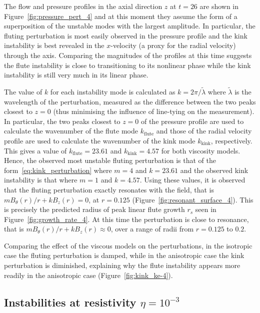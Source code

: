 \documentclass[fleqn,usenatbib]{mnras}
\newcommand{\rev}[1]{{\color{red} {#1}}}
\newcommand{\newold}[2]{{#1}{}}
\begin{document}
The \rev{flow and pressure profiles in the axial direction $z$} at
$t=26$ are shown in Figure~\ref{fig:pressure_pert_4} \rev{and at this
moment they assume the form of a superposition of the unstable modes
with the largest amplitude. In particular, the} fluting perturbation
  is most easily observed in the pressure \rev{profile and} \rev{\newold{}{ plotted
  as a function of $z$ following a line through the point $(r, \theta) = (0.101, 0)$.}} \rev{the} kink
instability is best revealed in the $x$-velocity (a proxy for the radial
velocity) through the axis. Comparing the magnitudes of the \rev{profiles} at
this time suggests the flute instability is close to transitioning to its
nonlinear phase while the kink instability is still very much in its linear
phase.

The value of $k$ for each \rev{instability mode} is calculated as $k
= 2\pi/\tilde{\lambda}$ where $\tilde{\lambda}$ is the wavelength of the
perturbation, measured as the difference between the two peaks closest to $z=0$
(thus minimising the influence of line-tying on the
measurement). \rev{In particular, the two peaks closest to $z=0$ of
  the pressure profile are used to calculate the wavenumber of
  the flute mode $k_{\text{flute}}$ and those of the radial velocity
  profile are used to calculate the wavenumber of
  the kink mode $k_{\text{kink}}$, respectively.} This gives
a value of $k_{\text{flute}}=23.61$ and $k_{\text{kink}}=4.57$ for both
viscosity models. Hence, the observed most unstable fluting perturbation is
that of the form~\eqref{eq:kink_perturbation} where $m=4$ and $k=23.61$ and the
observed kink instability is that where $m=1$ and $k=4.57$. Using these values,
it is observed that the fluting perturbation exactly resonates with the field,
that is $m B_{\theta}(r)/r + kB_z(r) = 0$, at $r=0.125$
(Figure~\ref{fig:resonant_surface_4}). This is precisely the predicted radius
of peak linear \rev{flute growth $r_s$} seen in
Figure~\ref{fig:growth_rate_4}. At this time the perturbation is close
to resonance, that is $m B_{\theta}(r)/r + kB_z(r)\approx 0$, over a
range of radii from $r=0.125$ to $0.2$.

Comparing the effect of the viscous models on the perturbations, \rev{in the
isotropic case the fluting perturbation is damped}, while in the anisotropic
case the kink perturbation is diminished, explaining why the flute instability
appears more readily in the anisotropic case (Figure~\ref{fig:kink_ke-4}).

\subsection{Instabilities at resistivity $\eta=10^{-3}$}
\end{document}

